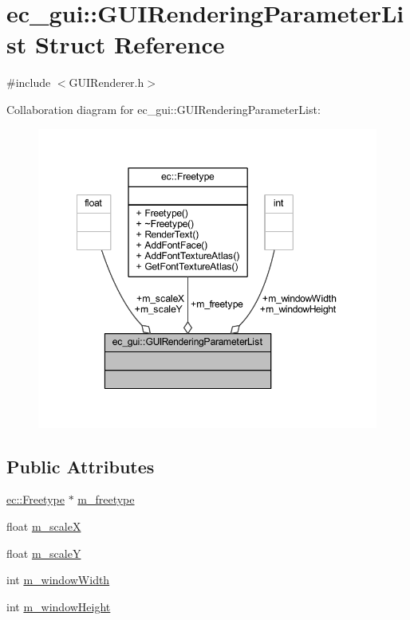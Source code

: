 \hypertarget{structec__gui_1_1_g_u_i_rendering_parameter_list}{}\section{ec\+\_\+gui\+:\+:G\+U\+I\+Rendering\+Parameter\+List Struct Reference}
\label{structec__gui_1_1_g_u_i_rendering_parameter_list}


{\ttfamily \#include $<$G\+U\+I\+Renderer.\+h$>$}



Collaboration diagram for ec\+\_\+gui\+:\+:G\+U\+I\+Rendering\+Parameter\+List\+:\nopagebreak
\begin{figure}[H]
\begin{center}
\leavevmode
\includegraphics[width=349pt]{structec__gui_1_1_g_u_i_rendering_parameter_list__coll__graph}
\end{center}
\end{figure}
\subsection*{Public Attributes}
\begin{DoxyCompactItemize}
\item 
\mbox{\hyperlink{classec_1_1_freetype}{ec\+::\+Freetype}} $\ast$ \mbox{\hyperlink{structec__gui_1_1_g_u_i_rendering_parameter_list_a6c7ef4e62687bd2a63f2f8ea19b9eb3d}{m\+\_\+freetype}}
\item 
float \mbox{\hyperlink{structec__gui_1_1_g_u_i_rendering_parameter_list_a69410a009418871bf89d73e79243a3a7}{m\+\_\+scaleX}}
\item 
float \mbox{\hyperlink{structec__gui_1_1_g_u_i_rendering_parameter_list_a43db5462ec0af9a429bc9fc023a84a24}{m\+\_\+scaleY}}
\item 
int \mbox{\hyperlink{structec__gui_1_1_g_u_i_rendering_parameter_list_a3e289510cff39a00b12db310e7835d86}{m\+\_\+window\+Width}}
\item 
int \mbox{\hyperlink{structec__gui_1_1_g_u_i_rendering_parameter_list_adaf529f554d97ca1b7e55ddcc6cf8a81}{m\+\_\+window\+Height}}
\end{DoxyCompactItemize}


